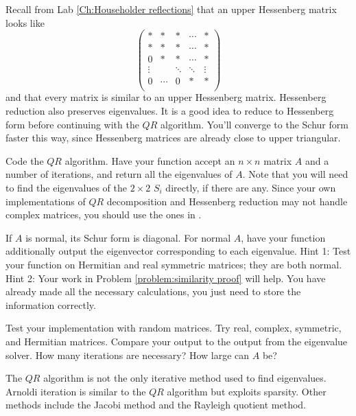 Recall from Lab \ref{Ch:Householder reflections} that an upper Hessenberg matrix looks like
\[
\begin{pmatrix}
*           & * & \ast & \cdots   & *\\
*           & * & * & \cdots   & * \\
0          & * & * &  \cdots&* \\
\vdots &  & \ddots    & \ddots & \vdots \\
0 & \cdots & 0 & * & *\\
\end{pmatrix} 
\]
and that every matrix is similar to an upper Hessenberg matrix. Hessenberg reduction also preserves eigenvalues. It is a good idea to reduce to Hessenberg form before continuing with the $QR$ algorithm. You'll converge to the Schur form faster this way, since Hessenberg matrices are already close to upper triangular.

\begin{problem}
Code the $QR$ algorithm. Have your function accept an $n \times n$ matrix $A$ and a number of iterations, and return all the eigenvalues of $A$. Note that you will need to find the eigenvalues of the $2 \times 2$ $S_i$ directly, if there are any. Since your own implementations of $QR$ decomposition and Hessenberg reduction may not handle complex matrices, you should use the ones in .
\end{problem}

\begin{problem}
If $A$ is normal, its Schur form is diagonal. For normal $A$, have your function additionally output the eigenvector corresponding to each eigenvalue. Hint 1: Test your function on Hermitian and real symmetric matrices; they are both normal. Hint 2: Your work in Problem \ref{problem:similarity proof} will help. You have already made all the necessary calculations, you just need to store the information correctly.
\end{problem}

\begin{problem}
Test your implementation with random matrices. Try real, complex, symmetric, and Hermitian matrices. Compare your output to the output from the eigenvalue solver. How many iterations are necessary? How large can $A$ be?
\end{problem}

The $QR$ algorithm is not the only iterative method used to find eigenvalues. Arnoldi iteration is similar to the $QR$ algorithm but exploits sparsity. Other methods include the Jacobi method and the Rayleigh quotient method.

